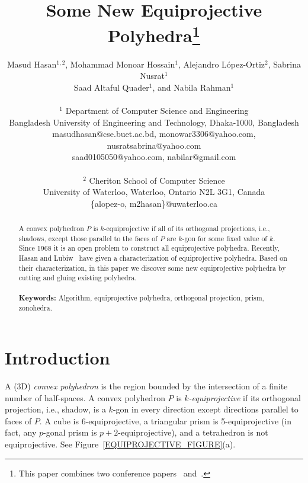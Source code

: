 \documentclass{article}
\title{Some New Equiprojective Polyhedra\thanks{This paper combines two conference papers~\cite{HHNL08}
and~\cite{RQH06}.}}
\author{Masud Hasan$^{1,2}$, Mohammad Monoar Hossain$^1$, Alejandro L\'opez-Ortiz$^2$, Sabrina Nusrat$^1$\\
Saad Altaful Quader$^1$, and Nabila Rahman$^1$\\
\\
$^1$ Department of Computer Science and Engineering\\
Bangladesh University of Engineering and Technology, Dhaka-1000, Bangladesh\\
masudhasan@cse.buet.ac.bd, monowar3306@yahoo.com, nusratsabrina@yahoo.com\\
saad0105050@yahoo.com, nabilar@gmail.com\\
\\
$^2$ Cheriton School of Computer Science\\
University of Waterloo, Waterloo, Ontario N2L 3G1, Canada\\
\{alopez-o, m2hasan\}@uwaterloo.ca}
\date{}
\begin{document}
\maketitle

\begin{abstract}
A convex polyhedron $P$ is $k$-equiprojective if all of its orthogonal projections,
i.e., shadows, except those parallel to the faces of $P$ are $k$-gon for 
some fixed value of $k$.
Since 1968 it is an open problem to construct all equiprojective polyhedra.
Recently, Hasan and Lubiw~\cite{HL08} have given a characterization of equiprojective polyhedra.
Based on their characterization, in this paper we discover some new equiprojective polyhedra
by cutting and gluing existing polyhedra.\\
\\
{\bf Keywords:} Algorithm, equiprojective polyhedra, orthogonal projection, prism, zonohedra.
\end{abstract}

\section{Introduction}
A (3D) \emph{convex polyhedron} is the region bounded by the 
intersection of a finite number of half-spaces. A convex polyhedron $P$ is {\it $k$-equiprojective\/} if 
its orthogonal projection, i.e., shadow, 
is a $k$-gon in every direction except directions parallel to faces of $P$.
A cube is 6-equiprojective, a triangular prism is 5-equiprojective
(in fact, any $p$-gonal prism is $p+2$-equiprojective), and
a tetrahedron is not equiprojective. 
See Figure~\ref{EQUIPROJECTIVE_FIGURE}(a).
\end{document}
